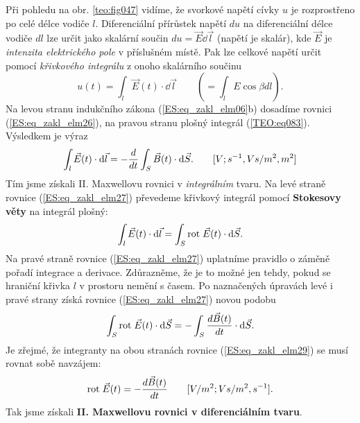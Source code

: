       Při pohledu na obr. \ref{teo:fig047} vidíme, že svorkové napětí cívky \(u\) je rozprostřeno po
      celé délce vodiče \(l\). Diferenciální přírůstek napětí \(du\) na diferenciální délce vodiče
      \(dl\) lze určit jako skalární součin \(du = \vec{E}\dd{\vec{l}}\) (napětí je skalár), kde
      \(\vec{E}\) je \emph{intenzita elektrického pole} v příslušném místě. Pak lze celkové napětí
      určit pomocí \emph{křivkového integrálu} z onoho skalárního součinu
      \begin{equation}\label{ES:eq_zakl_elm26}
        u(t) = \int_{l}\vec{E}(t)\cdot \dd{\vec{l}} \qquad (=\int_lE\cos\beta dl).
      \end{equation}
      Na levou stranu indukčního zákona (\ref{ES:eq_zakl_elm06}b) dosadíme rovnici
      (\ref{ES:eq_zakl_elm26}), na pravou stranu plošný integrál (\ref{TEO:eq083}). Výsledkem
      je výraz
      \begin{equation}\label{ES:eq_zakl_elm27}
        \int_{l}\vec{E}(t)\cdot \mathop{}\!\mathrm{d}\vec{l} = -\dfrac{d }{d t}\int_{S}\vec{B}(t)\cdot \mathop{}\!\mathrm{d}\vec{S}.
        \qquad [V;s^{-1},Vs/m^2,m^2]
      \end{equation}
      Tím jsme získali II. Maxwellovu rovnici v \emph{integrálním} tvaru. Na levé straně rovnice
      (\ref{ES:eq_zakl_elm27}) převedeme křivkový integrál pomocí \textbf{Stokesovy věty} na
      integrál plošný:
      \begin{equation}\label{ES:eq_zakl_elm28}
        \int_{l}\vec{E}(t)\cdot \mathop{}\!\mathrm{d}\vec{l} = \int_{S}\mathrm{rot}\;\vec{E}(t)\cdot \mathop{}\!\mathrm{d}\vec{S}.
      \end{equation}
      Na pravé straně rovnice (\ref{ES:eq_zakl_elm27}) uplatníme pravidlo o záměně pořadí integrace
      a derivace. Zdůrazněme, že je to možné jen tehdy, pokud se hraniční křivka \(l\) v prostoru
      nemění s časem. Po naznačených úpravách levé i pravé strany získá rovnice
      (\ref{ES:eq_zakl_elm27}) novou podobu
      \begin{equation}\label{ES:eq_zakl_elm29}
        \int_{S}\mathrm{rot}\;\vec{E}(t)\cdot \mathop{}\!\mathrm{d}\vec{S} = -\int_{S}\dfrac{d \vec{B}(t)}{d t}\cdot \mathop{}\!\mathrm{d}\vec{S}.
      \end{equation}
      Je zřejmé, že integranty na obou stranách rovnice (\ref{ES:eq_zakl_elm29}) se musí rovnat sobě
      navzájem:
      \begin{equation}\label{ES:eq_zakl_elm30}
        \mathrm{rot}\;\vec{E}(t) = -\dfrac{d \vec{B}(t)}{d t} \qquad [V/m^2;Vs/m^2,s^{-1}].
      \end{equation}
      Tak jsme získali \textbf{II. Maxwellovu rovnici v diferenciálním tvaru}.
      
